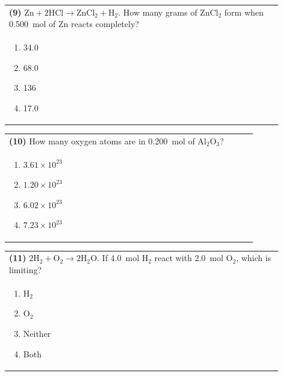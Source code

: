 \documentclass{article}
\begin{document}
\newpage

\noindent\begin{tabular}{|p{0.9\linewidth}|}
\hline
\textbf{(9)} $\text{Zn} + 2\text{HCl} \rightarrow \text{ZnCl}_2 + \text{H}_2$. How many grams of ZnCl$_2$ form when 0.500~mol of Zn reacts completely?\\[0.2cm]

\begin{minipage}[t]{0.85\linewidth}
\begin{enumerate}[label=\alph*.]
\item 34.0
\item 68.0
\item 136
\item 17.0
\end{enumerate}
\end{minipage}\\[0.2cm]
\hline
\end{tabular}

\vspace{0.2cm}
\noindent\begin{tabular}{|p{0.9\linewidth}|}
\hline
\textbf{(10)} How many oxygen atoms are in 0.200~mol of Al$_2$O$_3$?\\[0.2cm]

\begin{minipage}[t]{0.85\linewidth}
\begin{enumerate}[label=\alph*.]
\item $3.61\times10^{23}$
\item $1.20\times10^{23}$
\item $6.02\times10^{23}$
\item $7.23\times10^{23}$
\end{enumerate}
\end{minipage}\\[0.2cm]
\hline
\end{tabular}

\vspace{0.2cm}
\noindent\begin{tabular}{|p{0.9\linewidth}|}
\hline
\textbf{(11)} $2\text{H}_2 + \text{O}_2 \rightarrow 2\text{H}_2\text{O}$. If 4.0~mol H$_2$ react with 2.0~mol O$_2$, which is limiting?\\[0.2cm]

\begin{minipage}[t]{0.85\linewidth}
\begin{enumerate}[label=\alph*.]
\item H$_2$
\item O$_2$
\item Neither
\item Both
\end{enumerate}
\end{minipage}\\[0.2cm]
\hline
\end{tabular}
\end{document}
